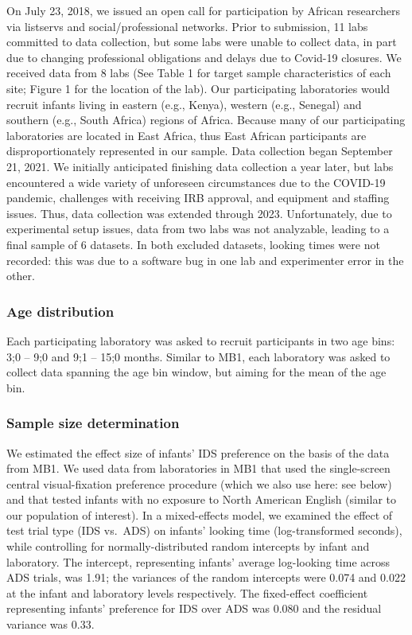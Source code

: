 \documentclass[
  english,
  ,man,floatsintext]{apa6}
\begin{document}
On July 23, 2018, we issued an open call for participation by African researchers via listservs and social/professional networks. Prior to submission, 11 labs committed to data collection, but some labs were unable to collect data, in part due to changing professional obligations and delays due to Covid-19 closures. We received data from 8 labs (See Table 1 for target sample characteristics of each site; Figure 1 for the location of the lab). Our participating laboratories would recruit infants living in eastern (e.g., Kenya), western (e.g., Senegal) and southern (e.g., South Africa) regions of Africa. Because many of our participating laboratories are located in East Africa, thus East African participants are disproportionately represented in our sample. Data collection began September 21, 2021. We initially anticipated finishing data collection a year later, but labs encountered a wide variety of unforeseen circumstances due to the COVID-19 pandemic, challenges with receiving IRB approval, and equipment and staffing issues. Thus, data collection was extended through 2023. Unfortunately, due to experimental setup issues, data from two labs was not analyzable, leading to a final sample of 6 datasets. In both excluded datasets, looking times were not recorded: this was due to a software bug in one lab and experimenter error in the other.

\subsubsection{Age distribution}\label{age-distribution}

Each participating laboratory was asked to recruit participants in two age bins: 3;0 -- 9;0 and 9;1 -- 15;0 months. Similar to MB1, each laboratory was asked to collect data spanning the age bin window, but aiming for the mean of the age bin.

\subsubsection{Sample size determination}\label{sample-size-determination}

We estimated the effect size of infants' IDS preference on the basis of the data from MB1. We used data from laboratories in MB1 that used the single-screen central visual-fixation preference procedure (which we also use here: see below) and that tested infants with no exposure to North American English (similar to our population of interest). In a mixed-effects model, we examined the effect of test trial type (IDS vs.~ADS) on infants' looking time (log-transformed seconds), while controlling for normally-distributed random intercepts by infant and laboratory. The intercept, representing infants' average log-looking time across ADS trials, was 1.91; the variances of the random intercepts were 0.074 and 0.022 at the infant and laboratory levels respectively. The fixed-effect coefficient representing infants' preference for IDS over ADS was 0.080 and the residual variance was 0.33.
\end{document}
